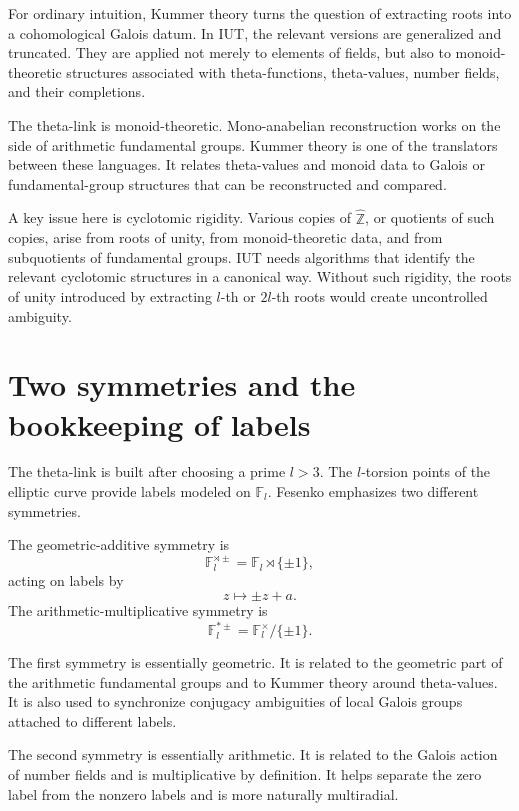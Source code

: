 For ordinary intuition, Kummer theory turns the question of extracting roots into a cohomological Galois datum.  In IUT, the relevant versions are generalized and truncated.  They are applied not merely to elements of fields, but also to monoid-theoretic structures associated with theta-functions, theta-values, number fields, and their completions.

\begin{remark}
The theta-link is monoid-theoretic.  Mono-anabelian reconstruction works on the side of arithmetic fundamental groups.  Kummer theory is one of the translators between these languages.  It relates theta-values and monoid data to Galois or fundamental-group structures that can be reconstructed and compared.
\end{remark}

A key issue here is cyclotomic rigidity.  Various copies of \(\widehat{\mathbb Z}\), or quotients of such copies, arise from roots of unity, from monoid-theoretic data, and from subquotients of fundamental groups.  IUT needs algorithms that identify the relevant cyclotomic structures in a canonical way.  Without such rigidity, the roots of unity introduced by extracting \(l\)-th or \(2l\)-th roots would create uncontrolled ambiguity.

\section{Two symmetries and the bookkeeping of labels}

The theta-link is built after choosing a prime \(l>3\).  The \(l\)-torsion points of the elliptic curve provide labels modeled on \(\mathbb F_l\).  Fesenko emphasizes two different symmetries.

\begin{definition}
The geometric-additive symmetry is
\[
  \mathbb F_l^{\rtimes\pm}=\mathbb F_l\rtimes\{\pm1\},
\]
acting on labels by
\[
  z\longmapsto \pm z+a.
\]
The arithmetic-multiplicative symmetry is
\[
  \mathbb F_l^{\ast\pm}=\mathbb F_l^{\times}/\{\pm1\}.
\]
\end{definition}

The first symmetry is essentially geometric.  It is related to the geometric part of the arithmetic fundamental groups and to Kummer theory around theta-values.  It is also used to synchronize conjugacy ambiguities of local Galois groups attached to different labels.

The second symmetry is essentially arithmetic.  It is related to the Galois action of number fields and is multiplicative by definition.  It helps separate the zero label from the nonzero labels and is more naturally multiradial.

